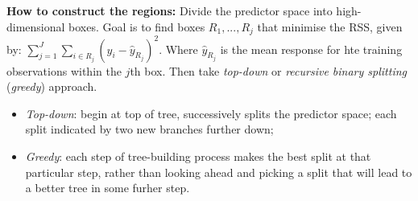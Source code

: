\documentclass[11pt]{article}
\begin{document}
\noindent \textbf{How to construct the regions:} Divide the predictor space into high-dimensional boxes. Goal is to find boxes $R_1, ..., R_j$ that minimise the RSS, given by: $\sum_{j=1}^{J}\sum_{i\in R_j}{(y_i - \hat{y}_{R_j})^2}$. Where $\hat{y}_{R_j}$ is the mean response for hte training observations within the $j$th box. Then take \textit{top-down} or \textit{recursive binary splitting} (\textit{greedy}) approach.
\\
\begin{itemize}
    \item \textit{Top-down}: begin at top of tree, successively splits the predictor space; each split indicated by two new branches further down;
    \item \textit{Greedy}: each step of tree-building process makes the best split at that particular step, rather than looking ahead and picking a split that will lead to a better tree in some furher step.
\end{itemize}
\phantom{i} \\
\end{document}
